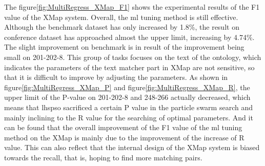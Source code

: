 \documentclass[twoside]{article}
\begin{document}
The figure\ref{fig:MultiRegress_XMap_F1} shows the experimental results of the F1 value of the XMap system.
Overall, the ml tuning method is still effective. Although the benchmark dataset has only increased by 1.8\%, the result on conference dataset has approached almost the upper limit, increasing by 4.74\%.
The slight improvement on benchmark is in result of the improvement being small on 201-202-8. This group of tasks focuses on the text of the ontology, which indicates the parameters of the text matcher part in XMap are not sensitive, so that it is difficult to improve by adjusting the parameters.
As shown in figure\ref{fig:MultiRegress_XMap_P} and figure\ref{fig:MultiRegress_XMap_R}, the upper limit of the P-value on 201-202-8 and 248-266 actually decreased, which means that lhspso sacrificed a certain P value in the particle swarm search and mainly inclining to the R value for the searching of optimal parameters.
And it can be found that the overall improvement of the F1 value of the ml tuning method on the XMap is mainly due to the improvement of the increase of R value. This can also reflect that the internal design of the XMap system is biased towards the recall, that is, hoping to find more matching pairs.
\end{document}
